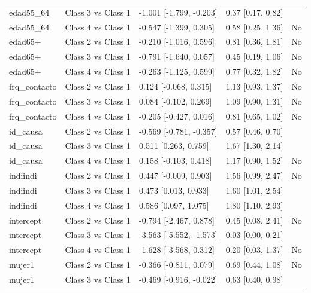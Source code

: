 \documentclass[
  letterpaper,
  DIV=11,
  numbers=noendperiod]{scrartcl}
\begin{document}
\begin{table}
{\begin{tabular*}{\linewidth}{@{\extracolsep{\fill}}lllll}
edad55\_64 & Class 3 vs Class 1 & -1.001 [-1.799, -0.203] & 0.37 [0.17, 0.82] & {\cellcolor[HTML]{E6F4EA}{Sí (p < .05)}} \\ 
edad55\_64 & Class 4 vs Class 1 & -0.547 [-1.399, 0.305] & 0.58 [0.25, 1.36] & No \\ 
edad65+ & Class 2 vs Class 1 & -0.210 [-1.016, 0.596] & 0.81 [0.36, 1.81] & No \\ 
edad65+ & Class 3 vs Class 1 & -0.791 [-1.640, 0.057] & 0.45 [0.19, 1.06] & No \\ 
edad65+ & Class 4 vs Class 1 & -0.263 [-1.125, 0.599] & 0.77 [0.32, 1.82] & No \\ 
frq\_contacto & Class 2 vs Class 1 & 0.124 [-0.068, 0.315] & 1.13 [0.93, 1.37] & No \\ 
frq\_contacto & Class 3 vs Class 1 & 0.084 [-0.102, 0.269] & 1.09 [0.90, 1.31] & No \\ 
frq\_contacto & Class 4 vs Class 1 & -0.205 [-0.427, 0.016] & 0.81 [0.65, 1.02] & No \\ 
id\_causa & Class 2 vs Class 1 & -0.569 [-0.781, -0.357] & 0.57 [0.46, 0.70] & {\cellcolor[HTML]{E6F4EA}{Sí (p < .05)}} \\ 
id\_causa & Class 3 vs Class 1 & 0.511 [0.263, 0.759] & 1.67 [1.30, 2.14] & {\cellcolor[HTML]{E6F4EA}{Sí (p < .05)}} \\ 
id\_causa & Class 4 vs Class 1 & 0.158 [-0.103, 0.418] & 1.17 [0.90, 1.52] & No \\ 
indiindi & Class 2 vs Class 1 & 0.447 [-0.009, 0.903] & 1.56 [0.99, 2.47] & No \\ 
indiindi & Class 3 vs Class 1 & 0.473 [0.013, 0.933] & 1.60 [1.01, 2.54] & {\cellcolor[HTML]{E6F4EA}{Sí (p < .05)}} \\ 
indiindi & Class 4 vs Class 1 & 0.586 [0.097, 1.075] & 1.80 [1.10, 2.93] & {\cellcolor[HTML]{E6F4EA}{Sí (p < .05)}} \\ 
intercept & Class 2 vs Class 1 & -0.794 [-2.467, 0.878] & 0.45 [0.08, 2.41] & No \\ 
intercept & Class 3 vs Class 1 & -3.563 [-5.552, -1.573] & 0.03 [0.00, 0.21] & {\cellcolor[HTML]{E6F4EA}{Sí (p < .05)}} \\ 
intercept & Class 4 vs Class 1 & -1.628 [-3.568, 0.312] & 0.20 [0.03, 1.37] & No \\ 
mujer1 & Class 2 vs Class 1 & -0.366 [-0.811, 0.079] & 0.69 [0.44, 1.08] & No \\ 
mujer1 & Class 3 vs Class 1 & -0.469 [-0.916, -0.022] & 0.63 [0.40, 0.98] & {\cellcolor[HTML]{E6F4EA}{Sí (p < .05)}} \\ 

\end{tabular*}}
\end{table}
\end{document}
